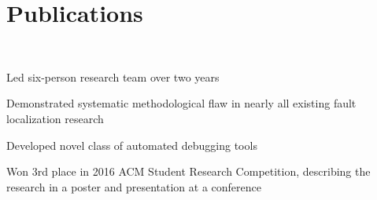\section{Publications}

 \\
\vspace{\topsep} %
\begin{tightemize}
\item Led six-person research team over two years
\item Demonstrated systematic methodological flaw in nearly all existing fault localization research
\item Developed novel class of automated debugging tools
\item Won 3rd place in 2016 ACM Student Research Competition, describing the research in a poster and presentation at a conference
\item {}
\end{tightemize}
\sectionsep
